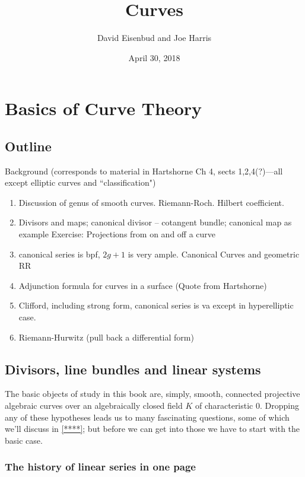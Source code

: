 \documentclass[12pt, leqno]{book}
\date{April 30, 2018}
\title{Curves}
\author{David Eisenbud and Joe Harris }
\begin{document}
\chapter{Basics of Curve Theory}
\section*{Outline}
 Background (corresponds to material in Hartshorne Ch 4, sects 1,2,4(?)---all except elliptic curves and ``classification")
\begin{enumerate}


\item Discussion of genus of smooth curves. Riemann-Roch. Hilbert coefficient.

\item Divisors and maps; canonical divisor -- cotangent bundle; canonical map as example
Exercise: Projections from on and off a curve

\item canonical series is bpf, $2g+1$ is very ample. Canonical Curves and geometric RR

\item Adjunction formula for curves in a surface (Quote from Hartshorne)

\item Clifford, including strong form, canonical series is va except in hyperelliptic case.

\item Riemann-Hurwitz (pull back a differential form)



\end{enumerate}

\section{Divisors, line bundles and linear systems}


The basic objects of study in this book are, simply, smooth, connected projective algebraic curves over an algebraically closed field $K$ of characteristic 0. Dropping any of these hypotheses leads us to many fascinating questions, some of which we'll discuss in \ref{****}; but before we can get into those we have to start with the basic case.


\subsection{The history of linear series in one page}
\end{document}
